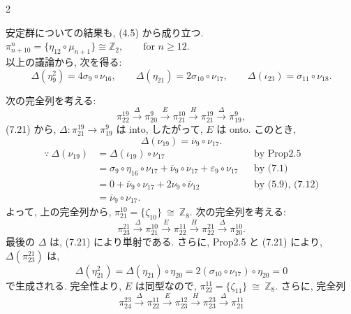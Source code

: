 \documentclass[10pt, leqno]{ltjsarticle}
\newcommand{\ov}[1]{\overline{#1}}
\newcommand{\gen}[1]{\{#1\}}       %
\newcommand{\pit}[2]{\pi_{#1}^{#2}}
\numberwithin{equation}{section}
\theoremstyle{plain}
\theoremstyle{definition}
\theoremstyle{remark}
\begin{document}
\begin{paracol}{2}

\noindent
安定群についての結果も, (4.5) から成り立つ. \\
\(
\pit{n+10}{n} = \gen{\eta_{12}\circ\mu_{n+1}} 
\cong \mathbb{Z}_2, \qquad \text{for } n\ge12 .
\)\\
以上の議論から, 次を得る:
\begin{equation}\label{eq:7.21}
\Delta(\eta_{9}^{2})=4\sigma_{9}\circ\nu_{16},\qquad
\Delta(\eta_{21})=2\sigma_{10}\circ\nu_{17},\qquad
\Delta(\iota_{23})=\sigma_{11}\circ\nu_{18}.
\end{equation}

次の完全列を考える:
\[
  \pit{22}{19}\xrightarrow{\ \Delta\ }
  \pit{20}{9}\xrightarrow{\ E\ }
  \pit{21}{10}\xrightarrow{\ H\ }
  \pit{21}{19}\xrightarrow{\ \Delta\ }
  \pit{19}{9},
\]
(7.21) から,
\(\Delta:\pit{21}{19}\to\pit{19}{9}\) は into, 
したがって, \(E\) は onto. 
このとき,
\begin{equation}\label{eq:7.22}
  \Delta(\nu_{19})=\overline{\nu}_{9}\circ\nu_{17}.
\end{equation}
\[
\begin{align*}
\because\ \Delta(\nu_{19}) 
& = \Delta(\iota_{19})\circ\nu_{17} 
&& \text{by Prop2.5}\\
& = \sigma_9\circ\eta_{16}\circ\nu_{17} 
+ \ov{\nu}_9\circ\nu_{17} + \varepsilon_9\circ\nu_{17}
&& \text{by (7.1)}\\
& = 0 + \ov{\nu}_9\circ\nu_{17} + 2\nu_9\circ\ov{\nu}_{12}
&& \text{by (5.9), (7.12)}\\
& = \ov{\nu}_9\circ\nu_{17} .
\end{align*}
\]
よって, 上の完全列から,
\(
  \pit{21}{10}=\gen{\zeta_{10}}\ \cong\ \mathbb Z_{8}.
\)
次の完全列を考える:
\[
  \pit{23}{21}\xrightarrow{\ \Delta\ }
  \pit{21}{10}\xrightarrow{\ E\ }
  \pit{22}{11}\xrightarrow{\ H\ }
  \pit{22}{21}\xrightarrow{\ \Delta\ }
  \pit{20}{10}.
\]
最後の \(\Delta\) は, (7.21) により単射である. さらに,
Prop2.5 と (7.21) により, 
\(\Delta(\pit{23}{21})\) は, 
\[
  \Delta(\eta_{21}^{2})
  =\Delta(\eta_{21})\circ\eta_{20}
  =2(\sigma_{10}\circ\nu_{17})\circ\eta_{20}
  =0
\]
で生成される.
完全性より, \(E\) は同型なので, 
\(
  \pit{22}{11}=\gen{\zeta_{11}}\ \cong\ \mathbb Z_{8}.
\)
さらに, 完全列
\[
  \pit{24}{23}\xrightarrow{\ \Delta\ }
  \pit{22}{11}\xrightarrow{\ E\ }
  \pit{23}{12}\xrightarrow{\ H\ }
  \pit{23}{23}\xrightarrow{\ \Delta\ }
  \pit{21}{11}
\]
\end{paracol}
\end{document}

